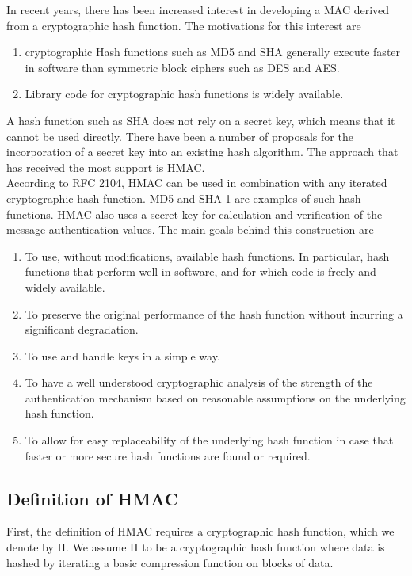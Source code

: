 \documentclass[12pt,a4paper,oneside]{report}
\begin{document}
In recent years, there has been increased interest in developing a MAC derived from a cryptographic hash function. The motivations for this interest are
\begin{enumerate}[(1)]
    \item cryptographic Hash functions such as MD5 and SHA generally execute faster in software than symmetric block ciphers such as DES and AES.
    \item Library code for cryptographic hash functions is widely available.
\end{enumerate}

A hash function such as SHA does not rely on a secret key, which means that it cannot be used directly. There have been a number of proposals for the incorporation of a secret key into an existing hash algorithm. The approach that has received the most support is HMAC. \\

According to RFC 2104\cite{RFC2104}, HMAC can be used in combination with any iterated cryptographic hash
   function. MD5 and SHA-1 are examples of such hash functions. HMAC
   also uses a secret key for calculation and verification of the
   message authentication values. The main goals behind this
   construction are
   
\begin{enumerate}[(1)]
    \item To use, without modifications, available hash functions.
     In particular, hash functions that perform well in software,
     and for which code is freely and widely available.
   \item To preserve the original performance of the hash function without
     incurring a significant degradation.
   \item To use and handle keys in a simple way.
   \item To have a well understood cryptographic analysis of the strength of
     the authentication mechanism based on reasonable assumptions on the
     underlying hash function.
   \item To allow for easy replaceability of the underlying hash function in
     case that faster or more secure hash functions are found or
     required.
\end{enumerate}

\subsection{Definition of HMAC}
First, the definition of HMAC requires a cryptographic hash function, which we denote by H. We assume H to be a cryptographic hash function where data is hashed by iterating a basic compression function on blocks of data.\\
\end{document}
